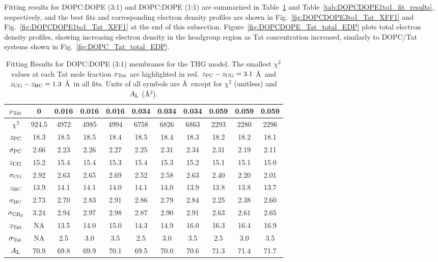 Fitting results for DOPC:DOPE (3:1) and DOPC:DOPE (1:1) are summarized 
in Table~\ref{tab:DOPCDOPE3to1_fit_results} and 
Table~\ref{tab:DOPCDOPE1to1_fit_results}, respectively,
and the best fits and corresponding electron density profiles are shown in 
Fig.~\ref{fig:DOPCDOPE3to1_Tat_XFF1} and Fig.~\ref{fig:DOPCDOPE1to1_Tat_XFF1}
at the end of this subsection. 
Figure~\ref{fig:DOPCDOPE_Tat_total_EDP} plots total electron density profiles,
showing increasing electron density in the headgroup region as Tat concentration
increased, similarly to DOPC/Tat systems shown in Fig.~\ref{fig:DOPC_Tat_total_EDP}.

\begin{table}[htbp]
  \centering
  \begin{tabular}{c|c|ccc|ccc|ccc}
    \hline
    $x_\textrm{Tat}$ & 0 & 0.016 & 0.016 & 0.016 & 0.034 & 0.034 & 0.034 & 0.059 & 0.059 & 0.059 \\
    \hline
    $\chi^2$ & 924.5 & {\color{red}4972} & 4985 & 4994 & {\color{red}6758} & 6826 & 6863 & 2293 & {\color{red}2280} & 2296 \\ 
    $z_\textrm{PC}$ & 18.3 & 18.5 & 18.5 & 18.4 & 18.5 & 18.4 & 18.3 & 18.2 & 18.2 & 18.1 \\
    $\sigma_\textrm{PC}$ & 2.66 & 2.23 & 2.26 & 2.27 & 2.25 & 2.31 & 2.34 & 2.31 & 2.19 & 2.11 \\
    $z_\textrm{CG}$ & 15.2 & 15.4 & 15.4 & 15.3 & 15.4 & 15.3 & 15.2 & 15.1 & 15.1 & 15.0 \\
    $\sigma_\textrm{CG}$ & 2.92 & 2.63 & 2.65 & 2.69 & 2.52 & 2.58 & 2.63 & 2.40 & 2.20 & 2.01 \\
    $z_\textrm{HC}$ & 13.9 & 14.1 & 14.1 & 14.0 & 14.1 & 14.0 & 13.9 & 13.8 & 13.8 & 13.7 \\
    $\sigma_\textrm{HC}$ & 2.73 & 2.70 & 2.83 & 2.91 & 2.86 & 2.79 & 2.84 & 2.25 & 2.38 & 2.60 \\
    $\sigma_{\textrm{CH}_3}$ & 3.24 & 2.94 & 2.97 & 2.98 & 2.87 & 2.90 & 2.91 & 2.63 & 2.61 & 2.65 \\
    $z_\textrm{Tat}$ & NA & 13.5 & 14.0 & 15.0 & 14.3 & 14.9 & 16.0 & 16.3 & 16.4 & 16.9 \\
    $\sigma_\textrm{Tat}$ & NA & 2.5 & 3.0 & 3.5 & 2.5 & 3.0 & 3.5 & 2.5 & 3.0 & 3.5 \\ 
    $A_\textrm{L}$ & 70.9 & 69.8 & 69.9 & 70.1 & 69.5 & 70.0 & 70.6 & 71.3 & 71.4 & 71.7 \\
    \hline
  \end{tabular}
  \caption[Fitting Results for DOPC:DOPE (3:1) membranes for the THG model]
  {Fitting Results for DOPC:DOPE (3:1) membranes for the THG model. 
  The smallest $\chi^2$ values at each Tat mole fraction $x_\textrm{Tat}$ are highlighted in red.  
  $z_\textrm{PC}-z_\textrm{CG} = 3.1$ \AA\ and $z_\textrm{CG}-z_\textrm{HC} = 1.3$ \AA\ in all fits.
  Units of all symbols are \AA\ except for $\chi^2$ (unitless) and $A_\textrm{L}$ (\AA$^2$).}
  \label{tab:DOPCDOPE3to1_fit_results}
\end{table}

